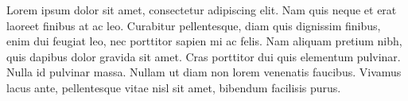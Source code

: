 
\cleardoublepage
\setcounter{savepage}{\thepage}
\begin{abstractpage}
Lorem ipsum dolor sit amet, consectetur adipiscing elit. Nam quis neque et erat laoreet finibus at ac leo. Curabitur pellentesque, diam quis dignissim finibus, enim dui feugiat leo, nec porttitor sapien mi ac felis. Nam aliquam pretium nibh, quis dapibus dolor gravida sit amet. Cras porttitor dui quis elementum pulvinar. Nulla id pulvinar massa. Nullam ut diam non lorem venenatis faucibus. Vivamus lacus ante, pellentesque vitae nisl sit amet, bibendum facilisis purus.
\end{abstractpage}

% 

\cleardoublepage